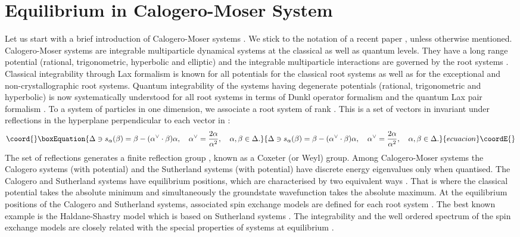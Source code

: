 \documentclass[a4paper,12pt]{article}
\begin{document}
\section{Equilibrium in Calogero-Moser System}
\label{calmo}
\setcounter{equation}{0}

Let us start with a brief introduction of
Calogero-Moser systems \cite{Cal,Sut,CalMo}.
We stick to the notation of a recent paper \cite{cs},
unless otherwise mentioned.
Calogero-Moser systems are integrable multiparticle dynamical systems
at the classical as well as  quantum levels.
They have a long range potential (rational, trigonometric,
hyperbolic and elliptic) and the integrable multiparticle interactions
are governed by the root systems \cite{OP1}.
Classical integrability through Lax formalism is known for all potentials
for the classical root systems \cite{OP1} as well as for the exceptional
\cite{DHoker_Phong,bcs2} and non-crystallographic \cite{bcs2} root systems.
Quantum integrability of the systems having degenerate potentials
(rational, trigonometric and hyperbolic) is now systematically understood
for all root systems in terms of Dunkl operator formalism \cite{Dunk,HeOp}
and the quantum Lax pair formalism \cite{bms,kps}.
To a system of \coordHE{} particles in one dimension, we associate a root system
\myHighlight{$\Delta$}\coordHE{}  of rank \coordHE{}. This is a set of vectors in \coordHE{}
invariant under reflections in the hyperplane perpendicular to each
vector in \myHighlight{$\Delta$}\coordHE{}:
\begin{equation}\coord{}\boxEquation{
   \Delta\ni s_{\alpha}(\beta)=\beta-(\alpha^{\vee}\cdot\beta)\alpha,
   \quad \alpha^{\vee}={2\alpha\over{\alpha^2}},
   \quad \alpha, \beta\in\Delta.
   \label{a1}
}{
   \Delta\ni s_{\alpha}(\beta)=\beta-(\alpha^{\vee}\cdot\beta)\alpha,
   \quad \alpha^{\vee}={2\alpha\over{\alpha^2}},
   \quad \alpha, \beta\in\Delta.
   }{ecuacion}\coordE{}\end{equation}
The set of reflections \coordHE{} generates a
finite reflection group \coordHE{}, known as a Coxeter (or Weyl) group.
Among Calogero-Moser systems the Calogero systems (with \coordHE{}
potential) and the Sutherland systems (with \coordHE{} potential) have
discrete energy eigenvalues only when quantised.
The Calogero and Sutherland systems have equilibrium positions,
which are characterised by two equivalent ways \cite{cs}. That is where
the classical potential takes the absolute minimum and simultaneously
the groundstate wavefunction takes the absolute maximum.
At the equilibrium positions of the Calogero and Sutherland systems,
associated spin exchange models are defined for each root system \cite{is1}.
The best known example is  the Haldane-Shastry model which is based on
\coordHE{} Sutherland systems \cite{halsha}.
The integrability and the well ordered spectrum of the spin exchange
models are closely related with the special properties of
systems at equilibrium \cite{cs}.
\end{document}
